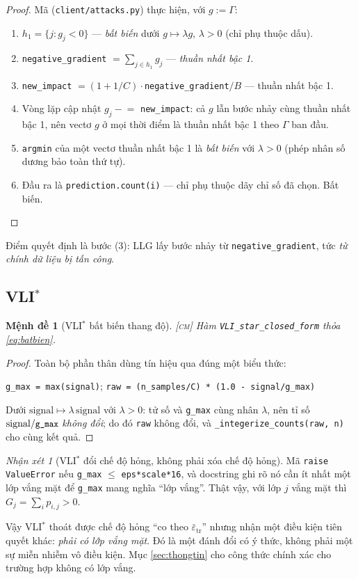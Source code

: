 \documentclass[11pt,a4paper]{article}
\newtheorem{menhde}[dinhly]{Mệnh đề}
\theoremstyle{remark}
\newtheorem{nhanxet}[dinhly]{Nhận xét}
\newcommand{\epstr}{\bar\varepsilon_{\mathrm{tr}}}
\newcommand{\code}[1]{\texttt{\small #1}}
\begin{document}
\begin{proof}
Mã (\code{client/attacks.py}) thực hiện, với $g:=\Gamma$:
\begin{enumerate}
\item $h_1=\{j:g_j<0\}$ --- \emph{bất biến} dưới $g\mapsto\lambda g$,
  $\lambda>0$ (chỉ phụ thuộc dấu).
\item \code{negative\_gradient} $=\sum_{j\in h_1}g_j$ --- \emph{thuần nhất
  bậc 1}.
\item \code{new\_impact} $=(1+1/C)\cdot$\code{negative\_gradient}$/B$ ---
  thuần nhất bậc 1.
\item Vòng lặp cập nhật $g_j \mathrel{-}= $ \code{new\_impact}: cả $g$ lẫn
  bước nhảy cùng thuần nhất bậc 1, nên vectơ $g$ ở mọi thời điểm là thuần
  nhất bậc 1 theo $\Gamma$ ban đầu.
\item \code{argmin} của một vectơ thuần nhất bậc 1 là \emph{bất biến} với
  $\lambda>0$ (phép nhân số dương bảo toàn thứ tự).
\item Đầu ra là \code{prediction.count(i)} --- chỉ phụ thuộc dãy chỉ số đã
  chọn. Bất biến.
\end{enumerate}
\end{proof}

Điểm quyết định là bước (3): LLG lấy bước nhảy từ \code{negative\_gradient},
tức \emph{từ chính dữ liệu bị tấn công}.

\subsection{VLI$^*$}

\begin{menhde}[VLI$^*$ bất biến thang độ]
\label{md:vlistar}
\textsc{[cm]}\; Hàm \code{VLI\_star\_closed\_form} thỏa \eqref{eq:batbien}.
\end{menhde}

\begin{proof}
Toàn bộ phần thân dùng tín hiệu qua đúng một biểu thức:
\begin{center}
\code{g\_max = max(signal)};\qquad
\code{raw = (n\_samples/C) * (1.0 - signal/g\_max)}
\end{center}
Dưới $\mathrm{signal}\mapsto\lambda\,\mathrm{signal}$ với $\lambda>0$: tử số
và \code{g\_max} cùng nhân $\lambda$, nên tỉ số
$\mathrm{signal}/\code{g\_max}$ \emph{không đổi}; do đó \code{raw} không đổi,
và \code{\_integerize\_counts(raw, n)} cho cùng kết quả.
\end{proof}

\begin{nhanxet}[VLI$^*$ đổi chế độ hỏng, không phải xóa chế độ hỏng]
\label{nx:vlidieukien}
Mã \code{raise ValueError} nếu \code{g\_max} $\le$ \code{eps*scale*16}, và
docstring ghi rõ nó cần ít nhất một lớp vắng mặt để \code{g\_max} mang nghĩa
``lớp vắng''. Thật vậy, với lớp $j$ vắng mặt thì $G_j=\sum_i p_{i,j}>0$.

Vậy VLI$^*$ thoát được chế độ hỏng ``co theo $\epstr$'' nhưng nhận một điều
kiện tiên quyết khác: \emph{phải có lớp vắng mặt}. Đó là một đánh đổi có ý
thức, không phải một sự miễn nhiễm vô điều kiện. Mục \ref{sec:thongtin} cho
công thức chính xác cho trường hợp không có lớp vắng.
\end{nhanxet}
\end{document}
